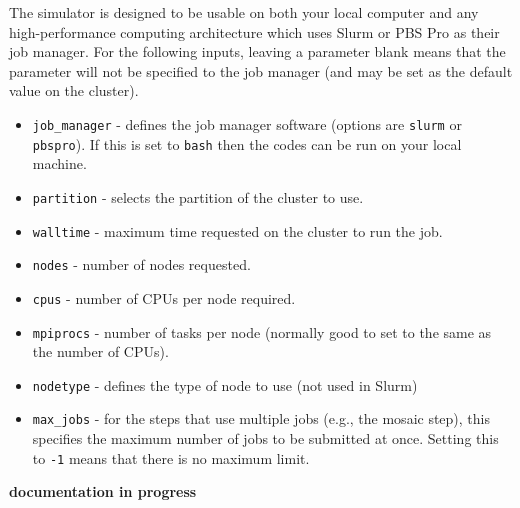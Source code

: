 \documentclass[11pt]{report_jfr}
\begin{document}
The simulator is designed to be usable on both your local computer and any high-performance computing architecture which uses Slurm or PBS Pro as their job manager. For the following inputs, leaving a parameter blank means that the parameter will not be specified to the job manager (and may be set as the default value on the cluster).
%
\begin{itemize}
	\item \texttt{job\_manager} - defines the job manager software (options are \texttt{slurm} or \texttt{pbspro}). If this is set to \texttt{bash} then the codes can be run on your local machine.
	\item \texttt{partition} - selects the partition of the cluster to use.
	\item \texttt{walltime} - maximum time requested on the cluster to run the job.
	\item \texttt{nodes} - number of nodes requested.
	\item \texttt{cpus} - number of CPUs per node required.
	\item \texttt{mpiprocs} - number of tasks per node (normally good to set to the same as the number of CPUs).
	\item \texttt{nodetype} - defines the type of node to use (not used in Slurm)
	\item \texttt{max\_jobs} - for the steps that use multiple jobs (e.g., the mosaic step), this specifies the maximum number of jobs to be submitted at once. Setting this to \texttt{-1} means that there is no maximum limit.
\end{itemize}

\textbf{documentation in progress}
\end{document}

